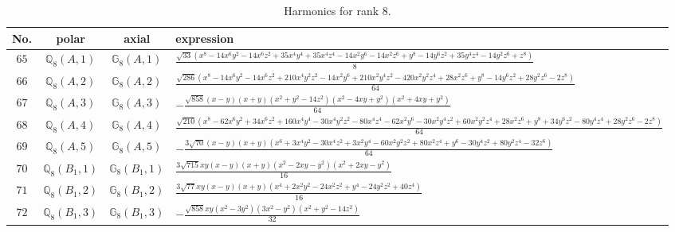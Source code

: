 \documentclass[fleqn,8pt,landscape]{jsarticle}
\begin{document}
\begin{table}[ht!]
\begin{center}
\caption{Harmonics for rank 8.}
\renewcommand{\arraystretch}{1.3}
\begin{tabular}{cccl} \hline \hline
No. & polar & axial & expression \\ \hline
$ 65 $ & $ \mathbb{Q}_{8}(A,1) $ & $ \mathbb{G}_{8}(A,1) $ & $ \frac{\sqrt{33} \left(x^{8} - 14 x^{6} y^{2} - 14 x^{6} z^{2} + 35 x^{4} y^{4} + 35 x^{4} z^{4} - 14 x^{2} y^{6} - 14 x^{2} z^{6} + y^{8} - 14 y^{6} z^{2} + 35 y^{4} z^{4} - 14 y^{2} z^{6} + z^{8}\right)}{8} $ \\
$ 66 $ & $ \mathbb{Q}_{8}(A,2) $ & $ \mathbb{G}_{8}(A,2) $ & $ \frac{\sqrt{286} \left(x^{8} - 14 x^{6} y^{2} - 14 x^{6} z^{2} + 210 x^{4} y^{2} z^{2} - 14 x^{2} y^{6} + 210 x^{2} y^{4} z^{2} - 420 x^{2} y^{2} z^{4} + 28 x^{2} z^{6} + y^{8} - 14 y^{6} z^{2} + 28 y^{2} z^{6} - 2 z^{8}\right)}{64} $ \\
$ 67 $ & $ \mathbb{Q}_{8}(A,3) $ & $ \mathbb{G}_{8}(A,3) $ & $ - \frac{\sqrt{858} \left(x - y\right) \left(x + y\right) \left(x^{2} + y^{2} - 14 z^{2}\right) \left(x^{2} - 4 x y + y^{2}\right) \left(x^{2} + 4 x y + y^{2}\right)}{64} $ \\
$ 68 $ & $ \mathbb{Q}_{8}(A,4) $ & $ \mathbb{G}_{8}(A,4) $ & $ \frac{\sqrt{210} \left(x^{8} - 62 x^{6} y^{2} + 34 x^{6} z^{2} + 160 x^{4} y^{4} - 30 x^{4} y^{2} z^{2} - 80 x^{4} z^{4} - 62 x^{2} y^{6} - 30 x^{2} y^{4} z^{2} + 60 x^{2} y^{2} z^{4} + 28 x^{2} z^{6} + y^{8} + 34 y^{6} z^{2} - 80 y^{4} z^{4} + 28 y^{2} z^{6} - 2 z^{8}\right)}{64} $ \\
$ 69 $ & $ \mathbb{Q}_{8}(A,5) $ & $ \mathbb{G}_{8}(A,5) $ & $ - \frac{3 \sqrt{70} \left(x - y\right) \left(x + y\right) \left(x^{6} + 3 x^{4} y^{2} - 30 x^{4} z^{2} + 3 x^{2} y^{4} - 60 x^{2} y^{2} z^{2} + 80 x^{2} z^{4} + y^{6} - 30 y^{4} z^{2} + 80 y^{2} z^{4} - 32 z^{6}\right)}{64} $ \\
$ 70 $ & $ \mathbb{Q}_{8}(B_{1},1) $ & $ \mathbb{G}_{8}(B_{1},1) $ & $ \frac{3 \sqrt{715} x y \left(x - y\right) \left(x + y\right) \left(x^{2} - 2 x y - y^{2}\right) \left(x^{2} + 2 x y - y^{2}\right)}{16} $ \\
$ 71 $ & $ \mathbb{Q}_{8}(B_{1},2) $ & $ \mathbb{G}_{8}(B_{1},2) $ & $ \frac{3 \sqrt{77} x y \left(x - y\right) \left(x + y\right) \left(x^{4} + 2 x^{2} y^{2} - 24 x^{2} z^{2} + y^{4} - 24 y^{2} z^{2} + 40 z^{4}\right)}{16} $ \\
$ 72 $ & $ \mathbb{Q}_{8}(B_{1},3) $ & $ \mathbb{G}_{8}(B_{1},3) $ & $ - \frac{\sqrt{858} x y \left(x^{2} - 3 y^{2}\right) \left(3 x^{2} - y^{2}\right) \left(x^{2} + y^{2} - 14 z^{2}\right)}{32} $ \\

\end{tabular}
\end{center}
\end{table}
\end{document}
